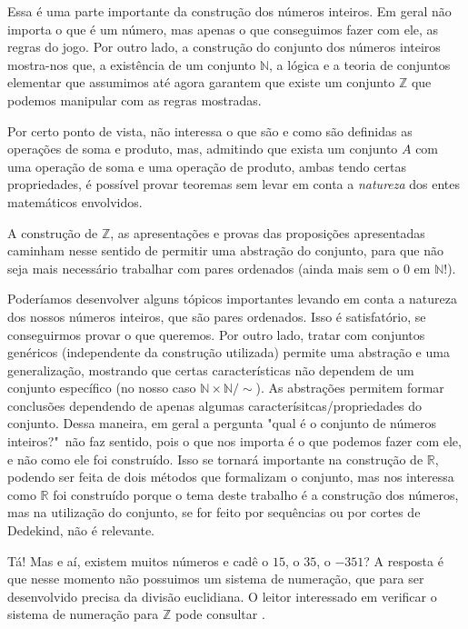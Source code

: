 \documentclass[../main.tex]{subfiles}
\begin{document}
Essa é uma parte importante da construção dos números inteiros. Em geral não importa o que é um número, mas apenas o que conseguimos fazer com ele, as regras do jogo. Por outro lado, a construção do conjunto dos números inteiros mostra-nos que, a existência de um conjunto $\mathbb{N}$, a lógica e a teoria de conjuntos elementar que assumimos até agora garantem que existe um conjunto $\mathbb{Z}$ que podemos manipular com as regras mostradas.

Por certo ponto de vista, não interessa o que são e como são definidas as operações de soma e produto, mas, admitindo que exista um conjunto $A$ com uma operação de soma e uma operação de produto, ambas tendo certas propriedades, é possível provar teoremas sem levar em conta a \emph{natureza} dos entes matemáticos envolvidos.

A construção de $\mathbb{Z}$, as apresentações e provas das proposições apresentadas caminham nesse sentido de permitir uma abstração do conjunto, para que não seja mais necessário trabalhar com pares ordenados (ainda mais sem o $0$ em $\mathbb{N}$!).

Poderíamos desenvolver alguns tópicos importantes levando em conta a natureza dos nossos números inteiros, que são pares ordenados. Isso é satisfatório, se conseguirmos provar o que queremos. Por outro lado, tratar com conjuntos genéricos (independente da construção utilizada) permite uma abstração e uma generalização, mostrando que certas características não dependem de um conjunto específico (no nosso caso $\mathbb{N} \times \mathbb{N} / \sim$). As abstrações permitem formar conclusões dependendo de apenas algumas caracterísitcas/propriedades do conjunto. Dessa maneira, em geral a pergunta "qual é o conjunto de números inteiros?"\ não faz sentido, pois o que nos importa é o que podemos fazer com ele, e não como ele foi construído. Isso se tornará importante na construção de $\mathbb{R}$, podendo ser feita de dois métodos que formalizam o conjunto, mas nos interessa como $\mathbb{R}$ foi construído porque o tema deste trabalho é a construção dos números, mas na utilização do conjunto, se for feito por sequências ou por cortes de Dedekind, não é relevante. 

Tá! Mas e aí, existem muitos números e cadê o $15$, o $35$, o $-351$? A resposta é que nesse momento não possuimos um sistema de numeração, que para ser desenvolvido precisa da divisão euclidiana. O leitor interessado em verificar o sistema de numeração para $\mathbb{Z}$ pode consultar \cite{hefez-algebra}.
\end{document}
